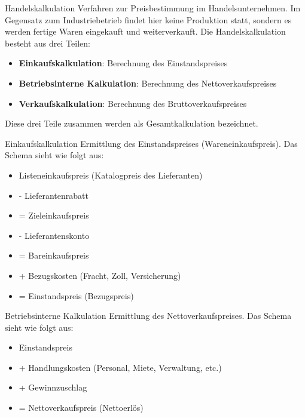 \begin{KR}{Handelskalkulation}
    Verfahren zur Preisbestimmung im Handelsunternehmen. Im Gegensatz zum Industriebetrieb findet hier keine Produktion statt, sondern es werden fertige Waren eingekauft und weiterverkauft. Die Handelskalkulation besteht aus drei Teilen:
\begin{itemize}
    \item \textbf{Einkaufskalkulation}: Berechnung des Einstandspreises
    \item \textbf{Betriebsinterne Kalkulation}: Berechnung des Nettoverkaufspreises
    \item \textbf{Verkaufskalkulation}: Berechnung des Bruttoverkaufspreises
\end{itemize}

Diese drei Teile zusammen werden als Gesamtkalkulation bezeichnet.
\end{KR}

\begin{definition}{Einkaufskalkulation}
    Ermittlung des Einstandspreises (Wareneinkaufspreis). Das Schema sieht wie folgt aus:
\begin{itemize}
    \item Listeneinkaufspreis (Katalogpreis des Lieferanten)
    \item - Lieferantenrabatt
    \item = Zieleinkaufspreis
    \item - Lieferantenskonto
    \item = Bareinkaufspreis
    \item + Bezugskosten (Fracht, Zoll, Versicherung)
    \item = Einstandspreis (Bezugspreis)
\end{itemize}
\end{definition}

\begin{definition}{Betriebsinterne Kalkulation}
    Ermittlung des Nettoverkaufspreises. Das Schema sieht wie folgt aus:
\begin{itemize}
    \item Einstandspreis
    \item + Handlungskosten (Personal, Miete, Verwaltung, etc.)
    \item + Gewinnzuschlag
    \item = Nettoverkaufspreis (Nettoerlös)
\end{itemize}
\end{definition}

